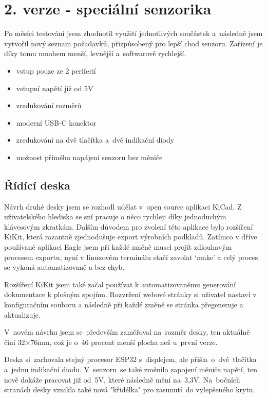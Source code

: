 \newpage





\section{2. verze - speciální senzorika}

Po měsíci testování jsem zhodnotil využití jednotlivých součástek a~následně jsem vytvořil nový seznam požadavků, přizpůsobený pro lepší chod senzoru.
Zařízení je díky tomu mnohem menší, levnější a~softwarově rychlejší.

\begin{itemize}
    \item vstup pouze ze 2 periferií
    \item vstupní napětí již od 5V
    \item zredukování rozměrů
    \item moderní USB-C konektor
    \item zredukování na dvě tlačítka a~dvě indikační diody
    \item možnost přímého napájení senzoru bez měniče
\end{itemize}

\subsection{Řídící deska}
Návrh druhé desky jsem se rozhodl udělat v~open source aplikaci KiCad.
Z uživatelského hlediska se sní pracuje o něco rychleji díky jednoduchým klávesovým zkratkám. 
Dalším důvodem pro zvolení této aplikace bylo rozšíření KiKit, která razantně zjednodušuje export výrobních podkladů.
Zatímco v dříve používané aplikaci Eagle jsem při každé změně musel projít zdlouhavým procesem exportu, nyní v linuxovém terminálu stačí zavolat `make' a celý proces se vykoná automatizovaně a bez chyb.

Rozšíření KiKit jsem také začal používat k automatizovanému generování dokumentace k plošným spojům.
Rozvržení webové stránky si uživatel nastaví v konfiguračním souboru a následně při každé změně se stránka přegeneruje a aktualizuje.

V~novém návrhu jsem se~především zaměřoval na~rozměr desky, ten aktuálně činí 32$\times$76mm, což je o~46 procent menší plocha než u~první verze.

Deska si~zachovala stejný procesor ESP32 s~displejem, ale přišla~o~dvě~tlačítka a~jednu indikační diodu.
V~senzoru~se také změnilo zapojení měniče napětí, ten nově dokáže pracovat již od~5V, které následně mění na~3,3V.
Na~bočních stranách desky vznikla také nová "křidélka" pro zasunutí~do vylepšeného krytu.



